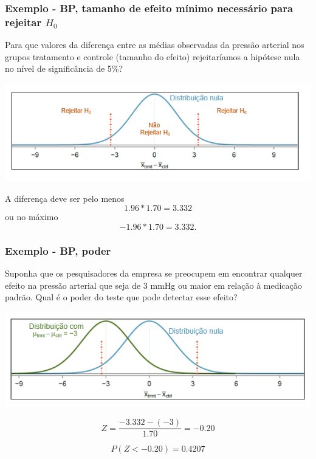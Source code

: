 
\begin{frame}
\frametitle{Exemplo - BP, tamanho de efeito mínimo necessário para rejeitar $H_0$}
\justifying
{\dq
{\footnotesize
Para que valores da diferença entre as médias observadas da pressão arterial nos grupos tratamento e controle (tamanho do efeito) rejeitaríamos a hipótese nula no nível de significância de 5\%?}
}

\pause

\includegraphics[width=\textwidth]{5-4_power/power_null_B_0_1-7_with_rejection_region.png}

\pause
\small{
\justifying
A diferença deve ser pelo menos 
\[ 1.96 * 1.70 = 3.332 \] 
\justifying
ou no máximo 
\[ -1.96 * 1.70 = 3.332. \]
}
\end{frame}


\begin{frame}
\frametitle{Exemplo - BP, poder}
\justifying
{\dq
{\footnotesize
Suponha que os pesquisadores da empresa se preocupem em encontrar qualquer efeito na pressão arterial que seja de 3 mmHg ou maior em relação à medicação padrão. Qual é o poder do teste que pode detectar esse efeito?
}}

\pause

\includegraphics[width=\textwidth]{5-4_power/power_null_C_0_1-7_with_alt_at_3.png}

\pause

\[ Z = \frac{-3.332 - (-3)}{1.70} = -0.20 \]

\pause

\[ P(Z < -0.20) = 0.4207 \]

\end{frame}

